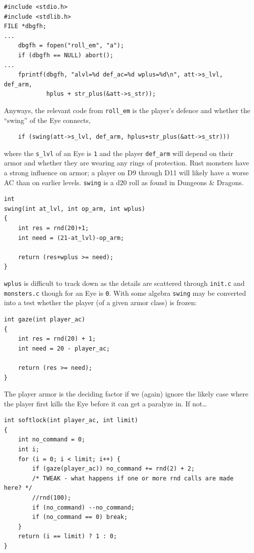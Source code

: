 \documentclass[12pt,a4paper]{article}
\begin{document}
\begin{verbatim}
#include <stdio.h>
#include <stdlib.h>
FILE *dbgfh;
...
    dbgfh = fopen("roll_em", "a");
    if (dbgfh == NULL) abort();
...
    fprintf(dbgfh, "alvl=%d def_ac=%d wplus=%d\n", att->s_lvl, def_arm,
            hplus + str_plus(&att->s_str));
\end{verbatim}

Anyways, the relevant code from \texttt{roll\_em} is the player's
defence and whether the ``swing'' of the Eye connects,

\begin{verbatim}
    if (swing(att->s_lvl, def_arm, hplus+str_plus(&att->s_str)))
\end{verbatim}

where the \texttt{s\_lvl} of an Eye is \texttt{1} and the player
\texttt{def\_arm} will depend on their armor and whether they are
wearing any rings of protection. Rust monsters have a strong influence
on armor; a player on D9 through D11 will likely have a worse AC than
on earlier levels. \texttt{swing} is a d20 roll as found in Dungeons
\& Dragons.

\begin{verbatim}
int
swing(int at_lvl, int op_arm, int wplus)
{
    int res = rnd(20)+1;
    int need = (21-at_lvl)-op_arm;

    return (res+wplus >= need);
}
\end{verbatim}

\texttt{wplus} is difficult to track down as the details are scattered
through \texttt{init.c} and \texttt{monsters.c} though for an Eye is
\texttt{0}. With some algebra \texttt{swing} may be converted into a
test whether the player (of a given armor class) is frozen:

\begin{verbatim}
int gaze(int player_ac)
{
    int res = rnd(20) + 1;
    int need = 20 - player_ac;

    return (res >= need);
}
\end{verbatim}

The player armor is the deciding factor if we (again) ignore the
likely case where the player first kills the Eye before it can get a
paralyze in. If not\ldots

\begin{verbatim}
int softlock(int player_ac, int limit)
{
    int no_command = 0;
    int i;
    for (i = 0; i < limit; i++) {
        if (gaze(player_ac)) no_command += rnd(2) + 2;
        /* TWEAK - what happens if one or more rnd calls are made here? */
        //rnd(100);
        if (no_command) --no_command;
        if (no_command == 0) break;
    }
    return (i == limit) ? 1 : 0;
}
\end{verbatim}
\end{document}
